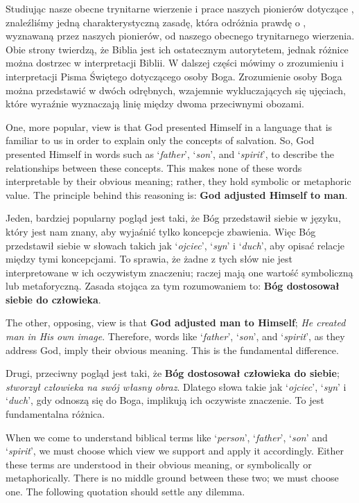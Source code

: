 Studiując nasze obecne trynitarne wierzenie i prace naszych pionierów dotyczące , znaleźliśmy jedną charakterystyczną zasadę, która odróżnia prawdę o , wyznawaną przez naszych pionierów, od naszego obecnego trynitarnego wierzenia. Obie strony twierdzą, że Biblia jest ich ostatecznym autorytetem, jednak różnice można dostrzec w interpretacji Biblii. W dalszej części mówimy o zrozumieniu i interpretacji Pisma Świętego dotyczącego osoby Boga. Zrozumienie osoby Boga można przedstawić w dwóch odrębnych, wzajemnie wykluczających się ujęciach, które wyraźnie wyznaczają linię między dwoma przeciwnymi obozami.


One, more popular, view is that God presented Himself in a language that is familiar to us in order to explain only the concepts of salvation. So, God presented Himself in words such as ‘\textit{father}’, ‘\textit{son}’, and ‘\textit{spirit}’, to describe the relationships between these concepts. This makes none of these words interpretable by their obvious meaning; rather, they hold symbolic or metaphoric value. The principle behind this reasoning is: \textbf{God adjusted Himself to man}.


Jeden, bardziej popularny pogląd jest taki, że Bóg przedstawił siebie w języku, który jest nam znany, aby wyjaśnić tylko koncepcje zbawienia. Więc Bóg przedstawił siebie w słowach takich jak ‘\textit{ojciec}’, ‘\textit{syn}’ i ‘\textit{duch}’, aby opisać relacje między tymi koncepcjami. To sprawia, że żadne z tych słów nie jest interpretowane w ich oczywistym znaczeniu; raczej mają one wartość symboliczną lub metaforyczną. Zasada stojąca za tym rozumowaniem to: \textbf{Bóg dostosował siebie do człowieka}.


The other, opposing, view is that \textbf{God adjusted man to Himself}; \textit{He created man in His own image}. Therefore, words like ‘\textit{father}’, ‘\textit{son}’, and ‘\textit{spirit}’, as they address God, imply their obvious meaning. This is the fundamental difference.


Drugi, przeciwny pogląd jest taki, że \textbf{Bóg dostosował człowieka do siebie}; \textit{stworzył człowieka na swój własny obraz}. Dlatego słowa takie jak ‘\textit{ojciec}’, ‘\textit{syn}’ i ‘\textit{duch}’, gdy odnoszą się do Boga, implikują ich oczywiste znaczenie. To jest fundamentalna różnica.


When we come to understand biblical terms like ‘\textit{person}’, ‘\textit{father}’, ‘\textit{son}’ and ‘\textit{spirit}’, we must choose which view we support and apply it accordingly. Either these terms are understood in their obvious meaning, or symbolically or metaphorically. There is no middle ground between these two; we must choose one. The following quotation should settle any dilemma.


